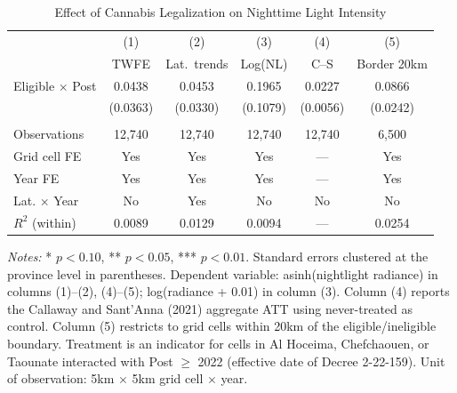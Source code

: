 \begin{table}[H]
\centering
\caption{Effect of Cannabis Legalization on Nighttime Light Intensity}
\begin{threeparttable}
\begin{tabular}{lccccc}
\toprule
 & (1) & (2) & (3) & (4) & (5) \\
 & TWFE & Lat.~trends & Log(NL) & C--S & Border 20km \\
\midrule
Eligible $\times$ Post & 0.0438 & 0.0453 & 0.1965 & 0.0227 & 0.0866 \\
 & (0.0363) & (0.0330) & (0.1079) & (0.0056) & (0.0242) \\
 \\
Observations & 12,740 & 12,740 & 12,740 & 12,740 & 6,500 \\
Grid cell FE & Yes & Yes & Yes & --- & Yes \\
Year FE & Yes & Yes & Yes & --- & Yes \\
Lat. $\times$ Year & No & Yes & No & No & No \\
$R^2$ (within) & 0.0089 & 0.0129 & 0.0094 & --- & 0.0254 \\
\bottomrule
\end{tabular}
\begin{tablenotes}[flushleft]
\small
\item \textit{Notes:} * $p<0.10$, ** $p<0.05$, *** $p<0.01$. Standard errors clustered at the province level in parentheses. Dependent variable: asinh(nightlight radiance) in columns (1)--(2), (4)--(5); log(radiance + 0.01) in column (3). Column (4) reports the Callaway and Sant'Anna (2021) aggregate ATT using never-treated as control. Column (5) restricts to grid cells within 20km of the eligible/ineligible boundary. Treatment is an indicator for cells in Al Hoceima, Chefchaouen, or Taounate interacted with Post $\geq$ 2022 (effective date of Decree 2-22-159). Unit of observation: 5km $\times$ 5km grid cell $\times$ year.
\end{tablenotes}
\end{threeparttable}
\label{tab:main}
\end{table}


